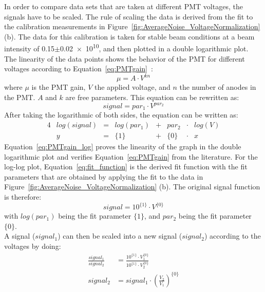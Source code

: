 In order to compare data sets that are taken at different PMT voltages, the signals have to be scaled. 
The rule of scaling the data is derived from the fit to the calibration measurements in Figure~\ref{fig:AverageNoise_VoltageNormalization} (b). 
The data for this calibration is taken for stable beam conditions at a beam intensity of \num{0.15}$\pm$\num{0.02e10}, and then plotted in a double logarithmic plot. 
The linearity of the data points shows the behavior of the PMT for different voltages according to Equation~\ref{eq:PMTgain}~\cite{Hamamatsu}:
\begin{equation}
 \mu = A \cdot V^{kn} 
 \label{eq:PMTgain}
\end{equation}
where $\mu$ is the PMT gain, $V$ the applied voltage, and $n$ the number of anodes in the PMT. 
$A$ and $k$ are free parameters. 
This equation can be rewritten as:
\begin{equation}
 signal = par_1 \cdot V^{par_2}
 \label{eq:PMTgain_simple}
\end{equation}
After taking the logarithmic of both sides, the equation can be written as:
\begin{alignat}{4}
 & log(signal) & = & log(par_1) & + & par_2 & \cdot &log(V) \label{eq:PMTgain_log} \\
 & y & = & \{1\} & + & \{0\} & \cdot & x \label{eq:fit_function}
\end{alignat}
Equation~\ref{eq:PMTgain_log} proves the linearity of the graph in the double logarithmic plot and verifies Equation~\ref{eq:PMTgain} from the literature. 
For the log-log plot, Equation~\ref{eq:fit_function} is the derived fit function with the fit parameters that are obtained by applying the fit to the data in Figure~\ref{fig:AverageNoise_VoltageNormalization} (b). 
The original signal function is therefore:
\begin{equation}
 signal = 10^{\{1\}} \cdot V^{\{0\}}
 \label{eq:PMTgain_simple_fitparameters}
\end{equation}
with $log(par_1)$ being the fit parameter $\{1\}$, and $par_2$ being the fit parameter $\{0\}$.\\
A signal ($signal_1$) can then be scaled into a new signal ($signal_2$) according to the voltages by doing:
\begin{align}
 \frac{signal_1}{signal_2} & = \frac{10^{\{1\}}\cdot V_1^{\{0\}}}{10^{\{1\}}\cdot V_2^{\{0\}}} \\
 signal_2 & = signal_1 \cdot \left( \frac{V_2}{V_1} \right) ^{\{0\}}
\end{align}


